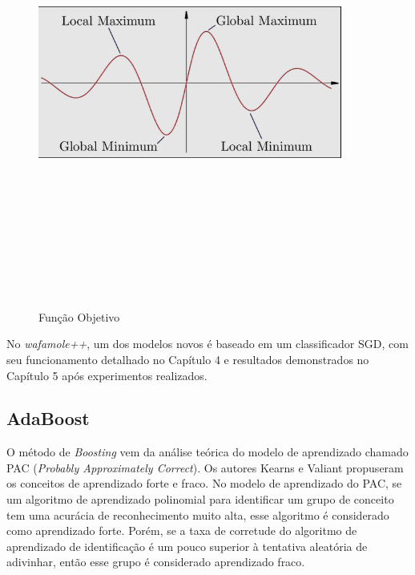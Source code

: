 \begin{figure}[ht]
    \centering
    \caption{Função Objetivo}
    \includegraphics[width=10cm,height=14cm,keepaspectratio]{figuras/funcao_objetivo.png} 
    \label{fig:internet} 
\end{figure}

No \textit{wafamole++}, um dos modelos novos é baseado em um classificador SGD, com seu funcionamento detalhado no Capítulo 4 e resultados demonstrados no Capítulo 5 após experimentos realizados.


\bigskip

\subsection{AdaBoost}

O método de \textit{Boosting} vem da análise teórica do modelo de aprendizado chamado PAC (\textit{Probably Approximately Correct}). Os autores Kearns e Valiant propuseram os conceitos de aprendizado forte e fraco. No modelo de aprendizado do PAC, se um algoritmo de aprendizado polinomial para identificar um grupo de conceito tem uma acurácia de reconhecimento muito alta, esse algoritmo é considerado como aprendizado forte. Porém, se a taxa de corretude do algoritmo de aprendizado de identificação é um pouco superior à tentativa aleatória de adivinhar, então esse grupo é considerado aprendizado fraco. 


